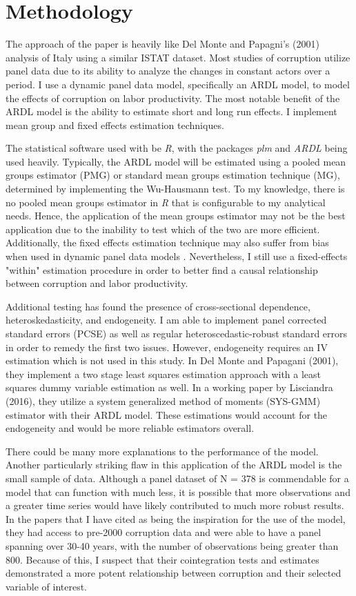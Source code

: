 \documentclass[12pt]{article} %
\begin{document}
\section*{Methodology}

The approach of the paper is heavily like Del Monte and Papagni’s (2001) analysis of Italy using a similar ISTAT dataset. Most studies of corruption utilize panel data due to its ability to analyze the changes in constant actors over a period. I use a dynamic panel data model, specifically an ARDL model, to model the effects of corruption on labor productivity. The most notable benefit of the ARDL model is the ability to estimate short and long run effects. I implement mean group and fixed effects estimation techniques. 

The statistical software used with be \emph{R}, with the packages \emph{plm} and \emph{ARDL} being used heavily. Typically, the ARDL model will be estimated using a pooled mean groups estimator (PMG) or standard mean groups estimation technique (MG), determined by implementing the Wu-Hausmann test. To my knowledge, there is no pooled mean groups estimator in \emph{R} that is configurable to my analytical needs. Hence, the application of the mean groups estimator may not be the best application due to the inability to test which of the two are more efficient. Additionally, the fixed effects estimation technique may also suffer from bias when used in dynamic panel data models \citep{nickell_biases_1981, pesaran_time_2015}. Nevertheless, I still use a fixed-effects "within" estimation procedure in order to better find a causal relationship between corruption and labor productivity. 

Additional testing has found the presence of cross-sectional dependence, heteroskedasticity, and endogeneity. I am able to implement panel corrected standard errors (PCSE) as well as regular heteroscedastic-robust standard errors in order to remedy the first two issues. However, endogeneity requires an IV estimation which is not used in this study. In Del Monte and Papagani (2001), they implement a two stage least squares estimation approach with a least squares dummy variable estimation as well. In a working paper by Lisciandra (2016), they utilize a system generalized method of moments (SYS-GMM) estimator with their ARDL model. These estimations would account for the endogeneity and would be more reliable estimators overall. 
 
There could be many more explanations to the performance of the model. Another particularly striking flaw in this application of the ARDL model is the small sample of data. Although a panel dataset of N = 378 is commendable for a model that can function with much less, it is possible that more observations and a greater time series would have likely contributed to much more robust results. In the papers that I have cited as being the inspiration for the use of the model, they had access to pre-2000 corruption data and were able to have a panel spanning over 30-40 years, with the number of observations being greater than 800. Because of this, I suspect that their cointegration tests and estimates demonstrated a more potent relationship between corruption and their selected variable of interest.
\end{document}
